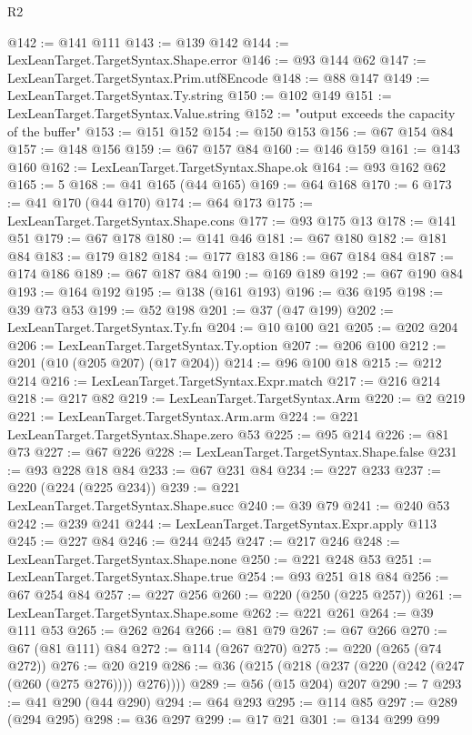 \begin{lexlean}{R2}
\begin{coremodule}
@142 := @141 @111
@143 := @139 @142
@144 := LexLeanTarget.TargetSyntax.Shape.error
@146 := @93 @144 @62
@147 := LexLeanTarget.TargetSyntax.Prim.utf8Encode
@148 := @88 @147
@149 := LexLeanTarget.TargetSyntax.Ty.string
@150 := @102 @149
@151 := LexLeanTarget.TargetSyntax.Value.string
@152 := "output exceeds the capacity of the buffer"
@153 := @151 @152
@154 := @150 @153
@156 := @67 @154 @84
@157 := @148 @156
@159 := @67 @157 @84
@160 := @146 @159
@161 := @143 @160
@162 := LexLeanTarget.TargetSyntax.Shape.ok
@164 := @93 @162 @62
@165 := 5
@168 := @41 @165 (@44 @165)
@169 := @64 @168
@170 := 6
@173 := @41 @170 (@44 @170)
@174 := @64 @173
@175 := LexLeanTarget.TargetSyntax.Shape.cons
@177 := @93 @175 @13
@178 := @141 @51
@179 := @67 @178
@180 := @141 @46
@181 := @67 @180
@182 := @181 @84
@183 := @179 @182
@184 := @177 @183
@186 := @67 @184 @84
@187 := @174 @186
@189 := @67 @187 @84
@190 := @169 @189
@192 := @67 @190 @84
@193 := @164 @192
@195 := @138 (@161 @193)
@196 := @36 @195
@198 := @39 @73 @53
@199 := @52 @198
@201 := @37 (@47 @199)
@202 := LexLeanTarget.TargetSyntax.Ty.fn
@204 := @10 @100 @21
@205 := @202 @204
@206 := LexLeanTarget.TargetSyntax.Ty.option
@207 := @206 @100
@212 := @201 (@10 (@205 @207) (@17 @204))
@214 := @96 @100 @18
@215 := @212 @214
@216 := LexLeanTarget.TargetSyntax.Expr.match
@217 := @216 @214
@218 := @217 @82
@219 := LexLeanTarget.TargetSyntax.Arm
@220 := @2 @219
@221 := LexLeanTarget.TargetSyntax.Arm.arm
@224 := @221 LexLeanTarget.TargetSyntax.Shape.zero @53
@225 := @95 @214
@226 := @81 @73
@227 := @67 @226
@228 := LexLeanTarget.TargetSyntax.Shape.false
@231 := @93 @228 @18 @84
@233 := @67 @231 @84
@234 := @227 @233
@237 := @220 (@224 (@225 @234))
@239 := @221 LexLeanTarget.TargetSyntax.Shape.succ
@240 := @39 @79
@241 := @240 @53
@242 := @239 @241
@244 := LexLeanTarget.TargetSyntax.Expr.apply @113
@245 := @227 @84
@246 := @244 @245
@247 := @217 @246
@248 := LexLeanTarget.TargetSyntax.Shape.none
@250 := @221 @248 @53
@251 := LexLeanTarget.TargetSyntax.Shape.true
@254 := @93 @251 @18 @84
@256 := @67 @254 @84
@257 := @227 @256
@260 := @220 (@250 (@225 @257))
@261 := LexLeanTarget.TargetSyntax.Shape.some
@262 := @221 @261
@264 := @39 @111 @53
@265 := @262 @264
@266 := @81 @79
@267 := @67 @266
@270 := @67 (@81 @111) @84
@272 := @114 (@267 @270)
@275 := @220 (@265 (@74 @272))
@276 := @20 @219
@286 := @36 (@215 (@218 (@237 (@220 (@242 (@247 (@260 (@275 @276)))) @276))))
@289 := @56 (@15 @204) @207
@290 := 7
@293 := @41 @290 (@44 @290)
@294 := @64 @293
@295 := @114 @85
@297 := @289 (@294 @295)
@298 := @36 @297
@299 := @17 @21
@301 := @134 @299 @99

\end{coremodule}
\end{lexlean}
